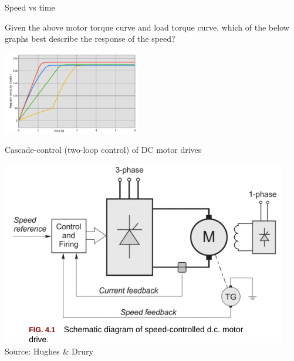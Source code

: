 \documentclass[dvisvgm,hypertex,aspectratio=169]{beamer}
\begin{document}
\note{%
}

\begin{frame}[label=L3E]{Speed vs time}
  \begin{center}
  \end{center}

  Given the above motor torque curve and load torque curve, which of the below graphs best describe the response of the speed? 

  \begin{center}
    \includegraphics[width=6cm]{./dc-response-crop.png}
  \end{center}
\end{frame}

\note{%
}

\begin{frame}[label=C0]{Cascade-control (two-loop control) of DC motor drives}
\begin{center}
   \includegraphics[width=0.6\linewidth]{HD-fig4_1.png}\\
   {\footnotesize Source: Hughes \& Drury}
   \end{center}
\end{frame}
\end{document}
